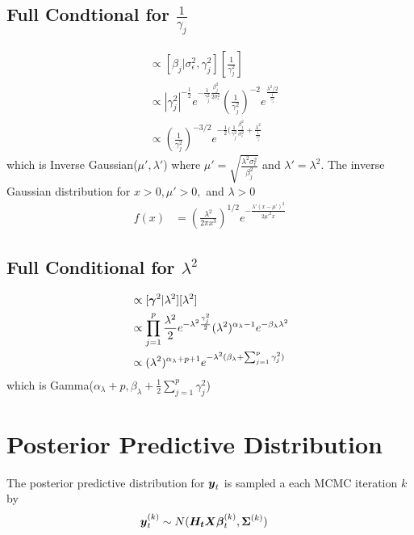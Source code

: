 \documentclass[fleqn]{article}
\def\bm#1{\mbox{\boldmath $#1$}}
\begin{document}
\subsection{Full Condtional for $\frac{1} {\gamma_j}$}
%
\begin{align*}
[ \frac{1} {\gamma^2_j} | \cdot ] & \propto [\beta_j | \sigma^2_\epsilon, \gamma^2_j] [\frac{1} {\gamma^2_j}]\\
%
& \propto | \gamma^2_j |^{ - \frac{1} {2}} e^{ - \frac{1} {\gamma^2_j} \frac{\beta^2_j} {2 \sigma^2_\epsilon}} ( \frac{1} {\gamma^2_j} )^{ - 2} e^{\frac{\lambda^2 / 2}{\frac{1} {\gamma^2_j}}}\\
& \propto (\frac{1} {\gamma^2_j})^{ - 3 / 2} e^{-\frac{1} {2} (\frac{1} {\gamma^2_j} \frac{\beta^2_j} {\sigma^2_\epsilon} + \frac{\lambda^2} {\frac{1} {\gamma^2_j}}}
\end{align*}
which is Inverse Gaussian($\mu', \lambda'$) where $\mu' = \sqrt{\frac{\lambda^2 \sigma^2_\epsilon} {\beta^2_j}}$ and $\lambda' = \lambda^2$. The inverse Gaussian distribution for $x > 0, \mu' > 0,$ and $\lambda > 0$
%
\begin{align*}
f(x) & = (\frac{\lambda^2} {2 \pi x^3})^{1 / 2} e^{ - \frac{\lambda'(x - \mu')^2} {2 \mu'^2 x}}
\end{align*}
%
\subsection{Full Conditional for $\lambda^2$}
%
\begin{align*}
[\lambda^2 | \cdot] & \propto [\bm{\gamma}^2 | \lambda^2] [\lambda^2]\\
%
& \propto \prod_{j = 1}^p \frac{\lambda^2} {2} e^{ - \lambda^2 \frac{\gamma^2_j} {2}} (\lambda^2)^{\alpha_\lambda - 1} e^{ - \beta_\lambda \lambda^2}\\
%
& \propto (\lambda^2)^{\alpha_\lambda + p + 1} e^{ - \lambda^2 (\beta_\lambda + \sum_{j = 1}^p \gamma^2_j)}
\end{align*}
%
which is Gamma($\alpha_\lambda + p, \beta_\lambda + \frac{1} {2} \sum_{j = 1}^p \gamma^2_j$)
%
\section{Posterior Predictive Distribution}
%
The posterior predictive distribution for $\bm{y}_t$ is sampled a each MCMC iteration $k$ by
\begin{align*}
  \bm{y}^{(k)}_t & \sim N(\bm{H_t} \bm{X} \bm{\beta}^{(k)}_t, \bm{\Sigma}^{(k)})
\end{align*}
\end{document}
